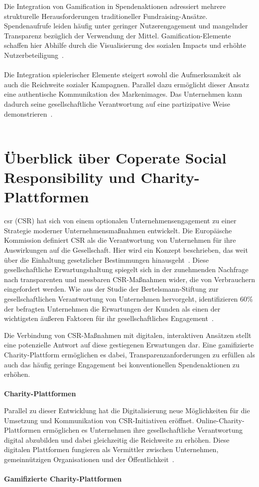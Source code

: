 Die Integration von Gamification in Spendenaktionen adressiert mehrere strukturelle Herausforderungen traditioneller Fundraising-Ansätze.
Spendenaufrufe leiden häufig unter geringer Nutzerengagement und mangelnder Transparenz bezüglich der Verwendung der Mittel.
Gamification-Elemente schaffen hier Abhilfe durch die Visualisierung des sozialen Impacts und erhöhte Nutzerbeteiligung~\cite{golrang2021applying}.
\\\\
Die Integration spielerischer Elemente steigert sowohl die Aufmerksamkeit als auch die Reichweite sozialer Kampagnen.
Parallel dazu ermöglicht dieser Ansatz eine authentische Kommunikation des Markenimages.
Das Unternehmen kann dadurch seine gesellschaftliche Verantwortung auf eine partizipative Weise demonstrieren~\cite{golrang2021applying}.
\\\\
\section{Überblick über Coperate Social Responsibility und Charity-Plattformen}
\gls{csr} (CSR) hat sich von einem optionalen Unternehmensengagement zu einer Strategie moderner Unternehmensmaßnahmen entwickelt.
Die Europäische Kommission definiert CSR als die Verantwortung von Unternehmen für ihre Auswirkungen auf die Gesellschaft.
Hier wird ein Konzept beschrieben, das weit über die Einhaltung gesetzlicher Bestimmungen hinausgeht~\cite{european_commission2011csr}.
Diese gesellschaftliche Erwartungshaltung spiegelt sich in der zunehmenden Nachfrage nach transparenten und messbaren CSR-Maßnahmen wider, die von Verbrauchern eingefordert werden.
Wie aus der Studie der Bertelsmann-Stiftung zur gesellschaftlichen Verantwortung von Unternehmen hervorgeht, identifizieren 60\% der befragten Unternehmen die Erwartungen der Kunden als einen der wichtigsten äußeren Faktoren für ihr gesellschaftliches Engagement~\cite{bertelsmann2006gesellschaftliche}.

Die Verbindung von CSR-Maßnahmen mit digitalen, interaktiven Ansätzen stellt eine potenzielle Antwort auf diese gestiegenen Erwartungen dar.
Eine gamifizierte Charity-Plattform ermöglichen es dabei, Transparenzanforderungen zu erfüllen als auch das häufig geringe Engagement bei konventionellen Spendenaktionen zu erhöhen.
\\\\
\textbf{Charity-Plattformen}

Parallel zu dieser Entwicklung hat die Digitalisierung neue Möglichkeiten für die Umsetzung und Kommunikation von CSR-Initiativen eröffnet.
Online-Charity-Plattformen ermöglichen es Unternehmen ihre gesellschaftliche Verantwortung digital abzubilden und dabei gleichzeitig die Reichweite zu erhöhen.
Diese digitalen Plattformen fungieren als Vermittler zwischen Unternehmen, gemeinnützigen Organisationen und der Öffentlichkeit~\cite{csr40_2020}.
\\\\
\textbf{Gamifizierte Charity-Plattformen}

